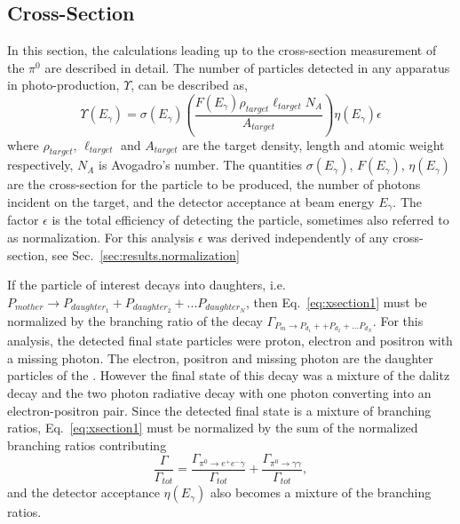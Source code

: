\subsection{Cross-Section}\label{sec:results.xsection}

In this section, the calculations leading up to the cross-section measurement of the $\pi^0$ are described in detail. The number of particles detected in any apparatus in photo-production, $\Upsilon$, can be described as,
\begin{equation}\label{eq:xsection1}
\Upsilon(E_\gamma) = \sigma(E_\gamma) \left(\frac{F(E_\gamma) \rho_{target}\ell_{target}N_A}{A_{target}}\right)\eta(E_\gamma)\epsilon
\end{equation}
where $\rho_{target}$, $\ell_{target}$ and $A_{target}$ are the target density, length and atomic weight respectively, $N_A$ is Avogadro's number. The quantities $\sigma(E_\gamma)$, $F(E_\gamma)$, $\eta(E_\gamma)$ are the cross-section for the particle to be produced, the number of photons incident on the target, and the detector acceptance at beam energy $E_\gamma$. The factor $\epsilon$ is the total efficiency of detecting the particle, sometimes also referred to as normalization. For this analysis $\epsilon$ was derived independently of any cross-section, see Sec.~\ref{sec:results.normalization}

If the particle of interest decays into daughters, i.e. $P_{mother}\rightarrow P_{daughter_1} +P_{daughter_2} + ...P_{daughter_N}$, then Eq.~\ref{eq:xsection1} must be normalized by the branching ratio of the decay $\Gamma_{P_{m}\rightarrow P_{d_1} + +P_{d_2} + ...P_{d_N}}$. For this analysis, the detected final state particles were proton, electron and positron with a missing photon. The electron, positron and missing photon are the daughter particles of the \pizT. However the final state of this decay was a mixture of the \pizT dalitz decay and the \pizT two photon radiative decay with one photon converting into an electron-positron pair. Since the detected final state is a mixture of branching ratios, Eq.~\ref{eq:xsection1} must be normalized by the sum of the normalized branching ratios contributing
\begin{equation}\label{eq:xsectionBR}
 \frac{\Gamma}{\Gamma_{tot}} = \frac{\Gamma_{\pi^{0}\rightarrow e^{+}e^{-}\gamma}}{\Gamma_{tot}} + \frac{\Gamma_{\pi^{0}\rightarrow \gamma \gamma}}{\Gamma_{tot}},
\end{equation}
and the detector acceptance $\eta(E_\gamma)$ also becomes a mixture of the branching ratios.

